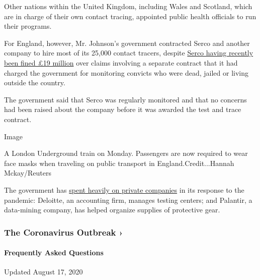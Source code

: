 Other nations within the United Kingdom, including Wales and Scotland,
which are in charge of their own contact tracing, appointed public
health officials to run their programs.

For England, however, Mr. Johnson's government contracted Serco and
another company to hire most of its 25,000 contact tracers, despite
\href{https://www.bbc.co.uk/news/business-48853870}{Serco having
recently been fined £19 million} over claims involving a separate
contract that it had charged the government for monitoring convicts who
were dead, jailed or living outside the country.

The government said that Serco was regularly monitored and that no
concerns had been raised about the company before it was awarded the
test and trace contract.

Image

A London Underground train on Monday. Passengers are now required to
wear face masks when traveling on public transport in
England.Credit...Hannah Mckay/Reuters

The government has
\href{https://www.theguardian.com/business/2020/may/04/uk-government-using-crisis-to-transfer-nhs-duties-to-private-sector}{spent
heavily on private companies} in its response to the pandemic: Deloitte,
an accounting firm, manages testing centers; and Palantir, a data-mining
company, has helped organize supplies of protective gear.

\href{https://www.nytimes3xbfgragh.onion/news-event/coronavirus?action=click\&pgtype=Article\&state=default\&region=MAIN_CONTENT_3\&context=storylines_faq}{}

\hypertarget{the-coronavirus-outbreak-}{%
\subsubsection{The Coronavirus Outbreak
›}\label{the-coronavirus-outbreak-}}

\hypertarget{frequently-asked-questions}{%
\paragraph{Frequently Asked
Questions}\label{frequently-asked-questions}}

Updated August 17, 2020

